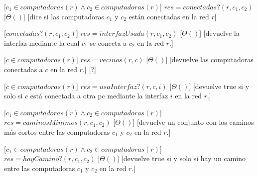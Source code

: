 \begin{Interfaz}
  [$c_1 \in computadoras(r) \land c_2 \in computadoras(r)$]
  {$res = conectadas?(r,c_1,c_2)$}
  [$\Theta()$]
  [dice si las computadoras $c_1$ y $c_2$ están conectadas en la red $r$]


  [$conectadas?(r,c_1,c_2)$]
  {$res = interfazUsada(r,c_1,c_2)$}
  [$\Theta()$]
  [devuelve la interfaz mediante la cual $c_1$ se conecta a $c_2$  en la red $r$.]


  [$c \in computadoras(r)$]
  {$res = vecinos(r,c)$}
  [$\Theta()$]
  [devuelve las computadoras conectadas a $c$ en la red $r$.]
  [?]


  [$c \in computadoras(r)$]
  {$res = usaInterfaz?(r,c,i)$}
  [$\Theta()$]
  [devuelve true si y solo si $c$ está conectada a otra pc mediante la interfaz $i$ en la red $r$.]


  [$c_1 \in computadoras(r) \land c_2 \in computadoras(r)$]
  {$res = caminosMinimos(r,c_1,c_2)$}
  [$\Theta()$]
  [devuelve un conjunto con los caminos más cortos entre las computadoras $c_1$ y $c_2$ en la red $r$.]


  [$c_1 \in computadoras(r) \land c_2 \in computadoras(r)$]
  {$res = hayCamino?(r,c_1,c_2)$}
  [$\Theta()$]
  [devuelve true si y solo si hay un camino entre las computadoras $c_1$ y $c_2$ en la red $r$.]



\end{Interfaz}


